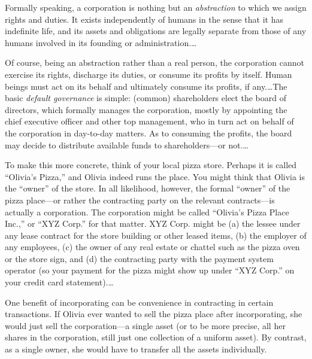 


Formally speaking, a corporation is nothing but an \emph{abstraction} to which
we assign rights and duties. It exists independently of humans in the sense that
it has indefinite life, and its assets and obligations are legally separate from
those of any humans involved in its founding or administration.\ldots

Of course, being an abstraction rather than a real person, the corporation
cannot exercise its rights, discharge its duties, or consume its profits by
itself. Human beings must act on its behalf and ultimately consume its profits,
if any.\ldots The basic \emph{default governance} is simple: (common)
shareholders elect the board of directors, which formally manages the
corporation, mostly by appointing the chief executive officer and other top
management, who in turn act on behalf of the corporation in day-to-day matters.
As to consuming the profits, the board may decide to distribute available funds
to shareholders---or not.\ldots

To make this more concrete, think of your local pizza store. Perhaps it is
called ``Olivia's Pizza,'' and Olivia indeed runs the place. You might think
that Olivia is the ``owner'' of the store. In all likelihood, however, the
formal ``owner'' of the pizza place---or rather the contracting party on the
relevant contracts---is actually a corporation. The corporation might be called
``Olivia's Pizza Place Inc.,'' or ``XYZ Corp.'' for that matter. XYZ Corp. might
be (a) the lessee under any lease contract for the store building or other
leased items, (b) the employer of any employees, (c) the owner of any real
estate or chattel such as the pizza oven or the store sign, and (d) the
contracting party with the payment system operator (so your payment for the
pizza might show up under ``XYZ Corp.'' on your credit card statement).\ldots

One benefit of incorporating can be convenience in contracting in certain
transactions. If Olivia ever wanted to sell the pizza place after incorporating,
she would just sell the corporation---a single asset (or to be more precise, all
her shares in the corporation, still just one collection of a uniform asset). By
contrast, as a single owner, she would have to transfer all the assets
individually.

